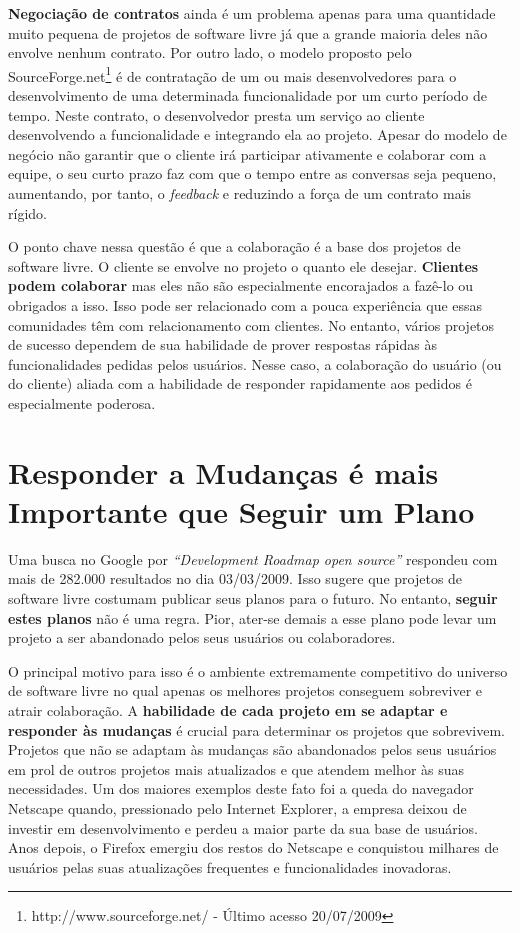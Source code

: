 \textbf{Negociação de contratos} ainda é um problema apenas para uma
quantidade muito pequena de projetos de software livre já que a grande
maioria deles não envolve nenhum contrato.  Por outro lado, o modelo
proposto pelo SourceForge.net\footnote{http://www.sourceforge.net/ -
  Último acesso 20/07/2009} é de contratação de um ou mais
desenvolvedores para o desenvolvimento de uma determinada
funcionalidade por um curto período de tempo. Neste contrato, o
desenvolvedor presta um serviço ao cliente desenvolvendo a
funcionalidade e integrando ela ao projeto. Apesar do modelo de
negócio não garantir que o cliente irá participar ativamente e
colaborar com a equipe, o seu curto prazo faz com que o tempo entre as
conversas seja pequeno, aumentando, por tanto, o \emph{feedback} e
reduzindo a força de um contrato mais rígido.

O ponto chave nessa questão é que a colaboração é a base dos projetos
de software livre.  O cliente se envolve no projeto o quanto ele
desejar. \textbf{Clientes podem colaborar} mas eles não são
especialmente encorajados a fazê-lo ou obrigados a isso. Isso pode ser
relacionado com a pouca experiência que essas comunidades têm com
relacionamento com clientes. No entanto, vários projetos de sucesso
dependem de sua habilidade de prover respostas rápidas às
funcionalidades pedidas pelos usuários. Nesse caso, a colaboração do
usuário (ou do cliente) aliada com a habilidade de responder
rapidamente aos pedidos é especialmente poderosa.

\section{Responder a Mudanças é mais Importante que Seguir um Plano}
\label{sec:fourth-princ}

Uma busca no Google por \emph{``Development Roadmap open source''}
respondeu com mais de 282.000 resultados no dia 03/03/2009. Isso
sugere que projetos de software livre costumam publicar seus planos
para o futuro. No entanto, \textbf{seguir estes planos} não é uma
regra. Pior, ater-se demais a esse plano pode levar um projeto a ser
abandonado pelos seus usuários ou colaboradores.

O principal motivo para isso é o ambiente extremamente competitivo do
universo de software livre no qual apenas os melhores projetos
conseguem sobreviver e atrair colaboração. A \textbf{habilidade de
  cada projeto em se adaptar e responder às mudanças} é crucial para
determinar os projetos que sobrevivem.  Projetos que não se adaptam às
mudanças são abandonados pelos seus usuários em prol de outros
projetos mais atualizados e que atendem melhor às suas necessidades.
Um dos maiores exemplos deste fato foi a queda do navegador Netscape
quando, pressionado pelo Internet Explorer, a empresa deixou de
investir em desenvolvimento e perdeu a maior parte da sua base de
usuários. Anos depois, o Firefox emergiu dos restos do Netscape e
conquistou milhares de usuários pelas suas atualizações frequentes e
funcionalidades inovadoras.

